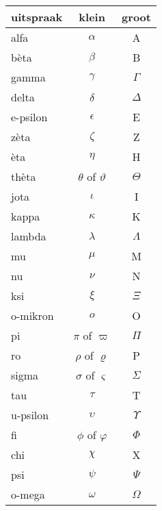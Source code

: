 \documentclass[12pt,twoside,a4paper]{article}
\begin{document}
\begin{center}
  \begin{tabular}{lcc}
    \hline
    \bf uitspraak & \bf klein & \bf groot \\
    \hline
    alfa & $\alpha$ & A\\
    bèta & $\beta$ & B\\
    gamma & $\gamma$ & $\Gamma$ \\
    delta & $\delta$ & $\Delta$ \\
    e-psilon & $\epsilon$ & E\\
    zèta & $\zeta$ & Z\\
    èta & $\eta$ & H\\
    thèta & $\theta$ of $\vartheta$ & $\Theta$\\
    jota & $\iota$ & I\\
    kappa & $\kappa$ & K\\
    lambda & $\lambda$ & $\Lambda$\\
    mu & $\mu$ & M\\
    nu & $\nu$ & N\\
    ksi & $\xi$ & $\Xi$\\
    o-mikron & $o$ & O\\
    pi & $\pi$ of $\varpi$ & $\Pi$\\
    ro & $\rho$ of $\varrho$ & P\\
    sigma & $\sigma$ of $\varsigma$ & $\Sigma$\\
    tau & $\tau$ & T\\
    u-psilon & $\upsilon$ & $\Upsilon$\\
    fi & $\phi$ of $\varphi$ & $\Phi$\\
    chi & $\chi$ & X\\
    psi & $\psi$ & $\Psi$\\
    o-mega & $\omega$ & $\Omega$\\
    \hline
  \end{tabular}
\end{center}
\end{document}
